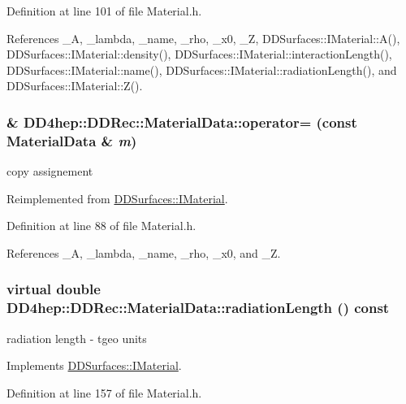Definition at line 101 of file Material.h.

References \_\-A, \_\-lambda, \_\-name, \_\-rho, \_\-x0, \_\-Z, DDSurfaces::IMaterial::A(), DDSurfaces::IMaterial::density(), DDSurfaces::IMaterial::interactionLength(), DDSurfaces::IMaterial::name(), DDSurfaces::IMaterial::radiationLength(), and DDSurfaces::IMaterial::Z().\hypertarget{class_d_d4hep_1_1_d_d_rec_1_1_material_data_af4fcb3ac628a39c87c895bcb478ac30d}{
\subsubsection[{operator=}]{\& DD4hep::DDRec::MaterialData::operator= (const {\bf MaterialData} \& {\em m})}}
\label{class_d_d4hep_1_1_d_d_rec_1_1_material_data_af4fcb3ac628a39c87c895bcb478ac30d}


copy assignement 

Reimplemented from \hyperlink{class_d_d_surfaces_1_1_i_material_ad50224941bead73447e93594edaaad04}{DDSurfaces::IMaterial}.

Definition at line 88 of file Material.h.

References \_\-A, \_\-lambda, \_\-name, \_\-rho, \_\-x0, and \_\-Z.\hypertarget{class_d_d4hep_1_1_d_d_rec_1_1_material_data_a75a9b15822c405e501758aa134806353}{
\subsubsection[{radiationLength}]{\setlength{\rightskip}{0pt plus 5cm}virtual double DD4hep::DDRec::MaterialData::radiationLength () const}}
\label{class_d_d4hep_1_1_d_d_rec_1_1_material_data_a75a9b15822c405e501758aa134806353}


radiation length -\/ tgeo units 

Implements \hyperlink{class_d_d_surfaces_1_1_i_material_a30bf2290a5f4616d6f0ad5bd2e500300}{DDSurfaces::IMaterial}.

Definition at line 157 of file Material.h.

